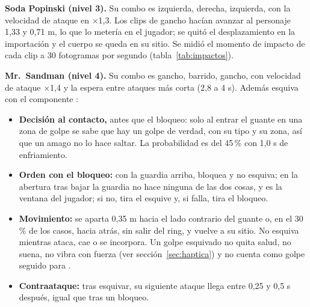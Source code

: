 \textbf{Soda Popinski (nivel 3).} Su combo es izquierda, derecha, izquierda, con la velocidad de ataque en $\times$1,3. Los clips de gancho hacían avanzar al personaje 1,33 y 0,71 m, lo que lo metería en el jugador; se quitó el desplazamiento en la importación y el cuerpo se queda en su sitio. Se midió el momento de impacto de cada clip a 30 fotogramas por segundo (tabla~\ref{tab:impactos}).

\begin{table}[H]
\centering
\caption{Tiempos de impacto medidos en los clips de ataque.}
\label{tab:impactos}
\end{table}

\textbf{Mr.\ Sandman (nivel 4).} Su combo es gancho, barrido, gancho, con velocidad de ataque $\times$1,4 y la espera entre ataques más corta (2,8 a 4 s). Además esquiva con el componente :
\begin{itemize}
  \item \textbf{Decisión al contacto,} antes que el bloqueo: solo al entrar el guante en una zona de golpe se sabe que hay un golpe de verdad, con su tipo y su zona, así que un amago no lo hace saltar. La probabilidad es del 45\,\% con 1,0 s de enfriamiento.
  \item \textbf{Orden con el bloqueo:} con la guardia arriba, bloquea y no esquiva; en la abertura tras bajar la guardia no hace ninguna de las dos cosas, y es la ventana del jugador; si no, tira el esquive y, si falla, tira el bloqueo.
  \item \textbf{Movimiento:} se aparta 0,35 m hacia el lado contrario del guante o, en el 30\,\% de los casos, hacia atrás, sin salir del ring, y vuelve a su sitio. No esquiva mientras ataca, cae o se incorpora. Un golpe esquivado no quita salud, no suena, no vibra con fuerza (ver sección~\ref{sec:haptica}) y no cuenta como golpe seguido para .
  \item \textbf{Contraataque:} tras esquivar, su siguiente ataque llega entre 0,25 y 0,5 s después, igual que tras un bloqueo.
\end{itemize}

